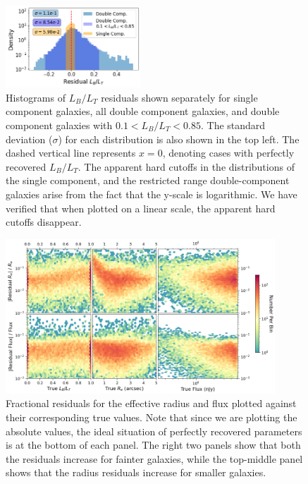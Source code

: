 \begin{figure}[hbt]
    \centering
    \includegraphics[width
    =0.45\textwidth]{residual_hist_bt_sep.png}
    \caption{Histograms of $L_B/L_T$ residuals shown separately for single component galaxies, all double component galaxies, and double component galaxies with $0.1 < L_B/L_T < 0.85$. The standard deviation ($\sigma$) for each distribution is also shown in the top left. The dashed vertical line represents $x = 0$, denoting cases with perfectly recovered $L_B/L_T$. The apparent hard cutoffs in the distributions of the single component, and the restricted range double-component galaxies arise from the fact that the y-scale is logarithmic. We have verified that when plotted on a linear scale, the apparent hard cutoffs disappear.}
    \label{fig_c2:residual_hist_bt_sep}
\end{figure}

\begin{figure}[htb]
    \centering
    \includegraphics[width
    =0.9\textwidth]{2d_hist_residuals_norm.png}
    \caption{Fractional residuals for the effective radius and flux plotted against their corresponding true values. Note that since we are plotting the absolute values, the ideal situation of perfectly recovered parameters is at the bottom of each panel. The right two panels show that both the residuals increase for fainter galaxies, while the top-middle panel shows that the radius residuals increase for smaller galaxies.}
    \label{fig_c2:2d_residual_hists_norm}
\end{figure}


